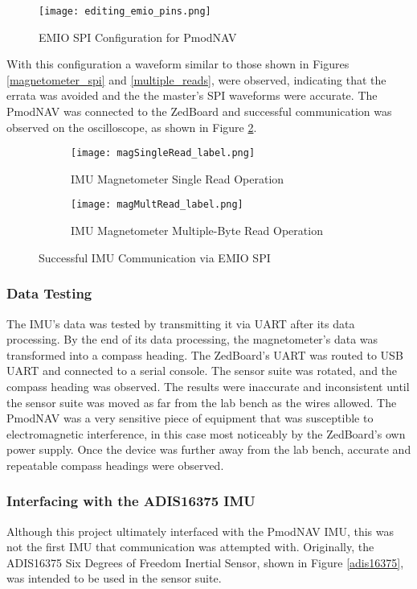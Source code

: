 \begin{figure}[H]
	\centerline{\texttt{[image: editing\_emio\_pins.png]}}
	\caption{EMIO SPI Configuration for PmodNAV}
	\label{emio_config}
\end{figure}

With this configuration a waveform similar to those shown in Figures \ref{magnetometer_spi} and \ref{multiple_reads}, were observed, indicating that the errata was avoided and the the master's SPI waveforms were accurate. The PmodNAV was connected to the ZedBoard and successful communication was observed on the oscilloscope, as shown in Figure \ref{OTPHJ}.

\begin{figure}[H] 
	\begin{subfigure}{1\textwidth}
	\centering
		\texttt{[image: magSingleRead\_label.png]}
		\caption{IMU Magnetometer Single Read Operation}
	\end{subfigure}
	\begin{subfigure}{1\textwidth}
	\centering
		\texttt{[image: magMultRead\_label.png]}
		\caption{IMU Magnetometer Multiple-Byte Read Operation}
	\end{subfigure}
	\caption{Successful IMU Communication via EMIO SPI}
	\label{OTPHJ}
\end{figure}

\subsubsection{Data Testing}
The IMU's data was tested by transmitting it via UART after its data processing. By the end of its data processing, the magnetometer's data was transformed into a compass heading. The ZedBoard's UART was routed to USB UART and connected to a serial console. The sensor suite was rotated, and the compass heading was observed. The results were inaccurate and inconsistent until the sensor suite was moved as far from the lab bench as the wires allowed. The PmodNAV was a very sensitive piece of equipment that was susceptible to electromagnetic interference, in this case most noticeably by the ZedBoard's own power supply. Once the device was further away from the lab bench, accurate and repeatable compass headings were observed.

\subsubsection{Interfacing with the ADIS16375 IMU}
Although this project ultimately interfaced with the PmodNAV IMU, this was not the first IMU that communication was attempted with. Originally, the ADIS16375 Six Degrees of Freedom Inertial Sensor, shown in Figure \ref{adis16375}, was intended to be used in the sensor suite.

